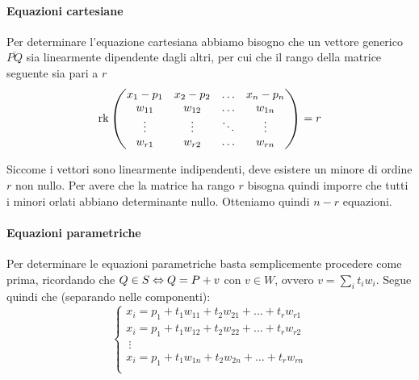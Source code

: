\documentclass{article}     %
\begin{document}
\begin{ex}[Generalizziano l'esempio seguente considerando lo spazio affine $\A$ di dimensione $n$ con il sistema di riferimento canonico e scriviamo le equazioni del sottospazio affine $S$ passante per $P=(p_1, \dots, p_n)$ con giacitura $W=\langle w_1,\dots, w_r\rangle$, dove $w_i=(w_{i1},\dots,w_{in})$ e i $w_i$ sono linearmente indipendenti.]
\paragraph*{Equazioni cartesiane}
Per determinare l'equazione cartesiana abbiamo bisogno che un vettore generico $\overline{PQ}$ sia linearmente dipendente dagli altri, per cui che il rango della matrice seguente sia pari a $r$
\[\operatorname{rk}\begin{pmatrix}
    x_1-p_1&x_2-p_2&\dots&x_n-p_n\\
    w_{11}&w_{12} & \dots & w_{1n}\\
    \vdots&\vdots&\ddots&\vdots\\
    w_{r1}&w_{r2} & \dots & w_{rn}\\
\end{pmatrix}=r\]

Siccome i vettori sono linearmente indipendenti, deve esistere un minore di ordine $r$ non nullo. Per avere che la matrice ha rango $r$ bisogna quindi imporre che tutti i minori orlati abbiano determinante nullo. Otteniamo quindi $n-r$ equazioni.
\paragraph*{Equazioni parametriche}
Per determinare le equazioni parametriche basta semplicemente procedere come prima, ricordando che $Q\in S \Leftrightarrow Q=P+v $ con $v\in W$, ovvero $v=\sum_it_iw_i$. Segue quindi che (separando nelle componenti):
\[\begin{cases}
    x_i=p_1+t_1w_{11}+t_2w_{21}+\dots+t_rw_{r1}\\
    x_i=p_1+t_1w_{12}+t_2w_{22}+\dots+t_rw_{r2}\\
    \ \vdots\\
    x_i=p_1+t_1w_{1n}+t_2w_{2n}+\dots+t_rw_{rn}\\
\end{cases}\]
\end{ex}


\newpage
\end{document}
